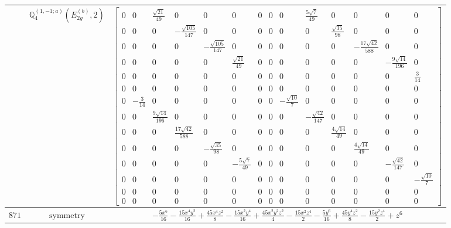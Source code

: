 \documentclass[fleqn,8pt,landscape]{jsarticle}
\begin{document}
\begin{longtable}{ccc}
$  $ & $ \mathbb{Q}_{4}^{(1,-1;a)}(E_{2g}^{(b)},2) $ & $ \begin{bmatrix} 0 & 0 & \frac{\sqrt{21}}{49} & 0 & 0 & 0 & 0 & 0 & 0 & \frac{5 \sqrt{7}}{49} & 0 & 0 & 0 & 0 \\ 0 & 0 & 0 & - \frac{\sqrt{105}}{147} & 0 & 0 & 0 & 0 & 0 & 0 & \frac{\sqrt{35}}{98} & 0 & 0 & 0 \\ 0 & 0 & 0 & 0 & - \frac{\sqrt{105}}{147} & 0 & 0 & 0 & 0 & 0 & 0 & - \frac{17 \sqrt{42}}{588} & 0 & 0 \\ 0 & 0 & 0 & 0 & 0 & \frac{\sqrt{21}}{49} & 0 & 0 & 0 & 0 & 0 & 0 & - \frac{9 \sqrt{14}}{196} & 0 \\ 0 & 0 & 0 & 0 & 0 & 0 & 0 & 0 & 0 & 0 & 0 & 0 & 0 & \frac{3}{14} \\ 0 & 0 & 0 & 0 & 0 & 0 & 0 & 0 & 0 & 0 & 0 & 0 & 0 & 0 \\ 0 & - \frac{3}{14} & 0 & 0 & 0 & 0 & 0 & 0 & - \frac{\sqrt{10}}{7} & 0 & 0 & 0 & 0 & 0 \\ 0 & 0 & \frac{9 \sqrt{14}}{196} & 0 & 0 & 0 & 0 & 0 & 0 & - \frac{\sqrt{42}}{147} & 0 & 0 & 0 & 0 \\ 0 & 0 & 0 & \frac{17 \sqrt{42}}{588} & 0 & 0 & 0 & 0 & 0 & 0 & \frac{4 \sqrt{14}}{49} & 0 & 0 & 0 \\ 0 & 0 & 0 & 0 & - \frac{\sqrt{35}}{98} & 0 & 0 & 0 & 0 & 0 & 0 & \frac{4 \sqrt{14}}{49} & 0 & 0 \\ 0 & 0 & 0 & 0 & 0 & - \frac{5 \sqrt{7}}{49} & 0 & 0 & 0 & 0 & 0 & 0 & - \frac{\sqrt{42}}{147} & 0 \\ 0 & 0 & 0 & 0 & 0 & 0 & 0 & 0 & 0 & 0 & 0 & 0 & 0 & - \frac{\sqrt{10}}{7} \\ 0 & 0 & 0 & 0 & 0 & 0 & 0 & 0 & 0 & 0 & 0 & 0 & 0 & 0 \\ 0 & 0 & 0 & 0 & 0 & 0 & 0 & 0 & 0 & 0 & 0 & 0 & 0 & 0 \end{bmatrix} $ \\ \hline
$ 871 $ & $ \text{symmetry} $ & $ - \frac{5 x^{6}}{16} - \frac{15 x^{4} y^{2}}{16} + \frac{45 x^{4} z^{2}}{8} - \frac{15 x^{2} y^{4}}{16} + \frac{45 x^{2} y^{2} z^{2}}{4} - \frac{15 x^{2} z^{4}}{2} - \frac{5 y^{6}}{16} + \frac{45 y^{4} z^{2}}{8} - \frac{15 y^{2} z^{4}}{2} + z^{6} $ \\

\end{longtable}
\end{document}

